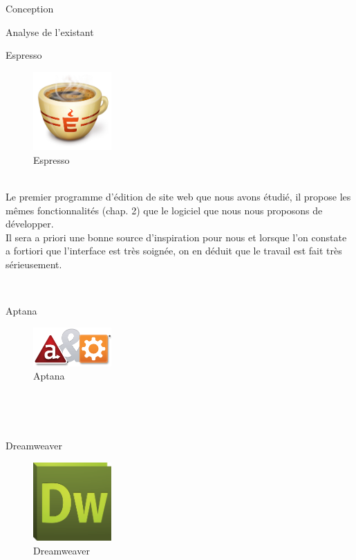 \documentclass[a4paper, 12pt]{report}
\begin{document}
	\begin{part}{Conception}
		\begin{chapter}{Analyse de l'existant}
			\begin{section}{Espresso}
				\begin{figure}[h]
					\begin{center}
						\includegraphics[width=3cm]{images/logoEspresso.png}
						\caption{Espresso}
					\end{center}
				\end{figure}~\\
				Le premier programme d'édition de site web que nous avons étudié, il propose les mêmes fonctionnalités (chap. 2) que le
				logiciel que nous nous proposons de développer.\\
				Il sera a priori une bonne source d'inspiration pour nous et lorsque l'on constate a fortiori que l'interface est très soignée, on en déduit que le travail est fait très sérieusement.
			\end{section}
			~\\
			\begin{section}{Aptana}
				\begin{figure}[h]
					\begin{center}
						\includegraphics[width=3cm]{images/logoAptana.png}
						\caption{Aptana}
					\end{center}
				\end{figure}~\\
			\end{section}
			~\\
			\begin{section}{Dreamweaver}
				\begin{figure}[h]
					\begin{center}
						\includegraphics[width=3cm]{images/logoDreamweaver.png}
						\caption{Dreamweaver}
					\end{center}
				\end{figure}~\\
				

\end{section}
\end{chapter}
\end{part}
\end{document}
